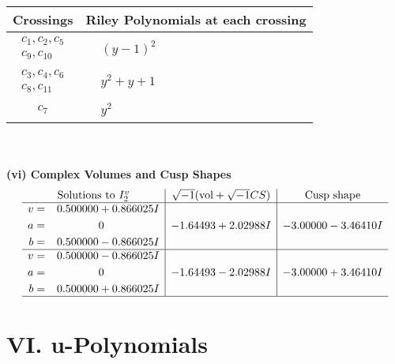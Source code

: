 \documentclass[1p]{elsarticle_modified}
\theoremstyle{definition}
\newcommand{\I}{\sqrt{-1}}
\begin{document}
\begin{tabular}{m{50pt}|m{274pt}}
Crossings & \hspace{64pt}Riley Polynomials at each crossing \\
\hline $$\begin{aligned}c_{1},c_{2},c_{5}\\c_{9},c_{10}\end{aligned}$$&$\begin{aligned}
&(y-1)^2
\end{aligned}$\\
\hline $$\begin{aligned}c_{3},c_{4},c_{6}\\c_{8},c_{11}\end{aligned}$$&$\begin{aligned}
&y^2+y+1
\end{aligned}$\\
\hline $$\begin{aligned}c_{7}\end{aligned}$$&$\begin{aligned}
&y^2
\end{aligned}$\\
\hline
\end{tabular}\\~\\
\newpage\flushleft \textbf{(vi) Complex Volumes and Cusp Shapes}
$$\begin{array}{c|c|c}  
\text{Solutions to }I^v_{2}& \I (\text{vol} + \sqrt{-1}CS) & \text{Cusp shape}\\
 \hline 
\begin{aligned}
v &= \phantom{-}0.500000 + 0.866025 I \\
a &= \phantom{-0.000000 } 0 \\
b &= \phantom{-}0.500000 - 0.866025 I\end{aligned}
 & -1.64493 + 2.02988 I & -3.00000 - 3.46410 I \\ \hline\begin{aligned}
v &= \phantom{-}0.500000 - 0.866025 I \\
a &= \phantom{-0.000000 } 0 \\
b &= \phantom{-}0.500000 + 0.866025 I\end{aligned}
 & -1.64493 - 2.02988 I & -3.00000 + 3.46410 I\\
 \hline 
 \end{array}$$\newpage
\newpage\renewcommand{\arraystretch}{1}
\centering \section*{ VI. u-Polynomials}
\end{document}
